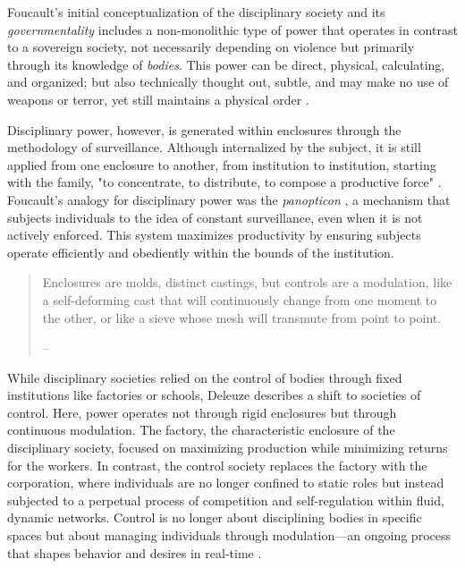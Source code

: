 Foucault's initial conceptualization of the disciplinary society and its \textit{governmentality} includes a non-monolithic type of power that operates in contrast to a sovereign society, not necessarily depending on violence but primarily through its knowledge of \textit{bodies}. This power can be direct, physical, calculating, and organized; but also technically thought out, subtle, and may make no use of weapons or terror, yet still maintains a physical order \parencite[25-26]{Foucault1995}.

Disciplinary power, however, is generated within enclosures through the methodology of surveillance. Although internalized by the subject, it is still applied from one enclosure to another, from institution to institution, starting with the family, "to concentrate, to distribute, to compose a productive force" \parencite[3]{deleuze1992a}. Foucault's analogy for disciplinary power was the \textit{panopticon} \parencite[see]{Foucault1995}, a mechanism that subjects individuals to the idea of constant surveillance, even when it is not actively enforced. This system maximizes productivity by ensuring subjects operate efficiently and obediently within the bounds of the institution.

\begin{quote} Enclosures are molds, distinct castings, but controls are a modulation, like a self-deforming cast that will continuously change from one moment to the other, or like a sieve whose mesh will transmute from point to point.

-- \cite[4]{deleuze1992a} \end{quote}

While disciplinary societies relied on the control of bodies through fixed institutions like factories or schools, Deleuze describes a shift to societies of control. Here, power operates not through rigid enclosures but through continuous modulation. The factory, the characteristic enclosure of the disciplinary society, focused on maximizing production while minimizing returns for the workers. In contrast, the control society replaces the factory with the corporation, where individuals are no longer confined to static roles but instead subjected to a perpetual process of competition and self-regulation within fluid, dynamic networks. Control is no longer about disciplining bodies in specific spaces but about managing individuals through modulation—an ongoing process that shapes behavior and desires in real-time \parencite[see 4]{deleuze1992a}.

